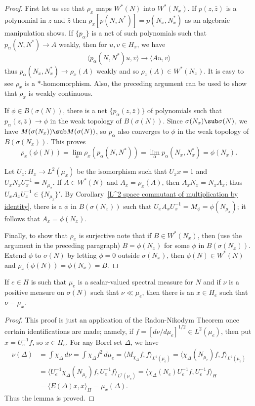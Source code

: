 \begin{proof}
First let us see that $\rho_x$ maps $W^*(N)$ into $W^*(N_x)$. If $p(z,\bar{z})$ is a polynomial in $z$ and $\bar{z}$ then $\rho_x[p(N,N^*)]=p(N_x,N_x^*)$ as an algebraic manipulation shows. If $\{p_\alpha\}$ is a net of such polynomials such that $p_\alpha(N,N^*)\to A$ weakly, then for $u,v\in H_x$, we have
\[\langle p_\alpha(N,N^*)u,v\rangle\to\langle Au,v\rangle\]
thus $p_\alpha(N_x,N_x^*)\to\rho_x(A)$ weakly and so $\rho_x(A)\in W^*(N_x)$. It is easy to see $\rho_x$ is a $*$-homomorphism. Also, the preceding argument can be used to show that $\rho_x$ is weakly continuous.\par
If $\phi\in B(\sigma(N))$, there is a net $\{p_\alpha(z,\bar{z})\}$ of polynomials such that $p_\alpha(z,\bar{z})\to\phi$ in the weak topology of $B(\sigma(N))$. Since $\sigma(N_x)\sub\sigma(N)$, we have $M(\sigma(N_x))\sub M(\sigma(N))$, so $p_\alpha$ also converges to $\phi$ in the weak topology of $B(\sigma(N_x))$. This proves
\[\rho_x(\phi(N))=\lim_{\alpha}\rho_x(p_\alpha(N,N^*))=\lim_\alpha p_\alpha(N_x,N_x^*)=\phi(N_x).\]

Let $U_x:H_x\to L^2(\mu_x)$ be the isomorphism such that $U_xx=1$ and $U_xN_xU_x^{-1}=N_{\mu_x}$. If $A\in W^*(N)$ and $A_x=\rho_x(A)$, then $A_xN_x=N_xA_x$; thus $U_xA_xU_x^{-1}\in\{N_{\mu_x}\}'$. By Corollary~\ref{L^2 space commutant of multiplication by identity}, there is a $\phi$ in $B(\sigma(N_x))$ such that $U_xA_xU_x^{-1}=M_\phi=\phi(N_{\mu_x})$; it follows that $A_x=\phi(N_x)$.\par
Finally, to show that $\rho_x$ is surjective note that if $B\in W^*(N_x)$, then (use the argument in the preceding paragraph) $B=\phi(N_x)$ for some $\phi$ in $B(\sigma(N_x))$. Extend $\phi$ to $\sigma(N)$ by letting $\phi=0$ outside $\sigma(N_x)$, then $\phi(N)\in W^*(N)$ and $\rho_x(\phi(N))=\phi(N_x)=B$.
\end{proof}
\begin{lemma}\label{Hilbert space scalar spectral measure char}
If $e\in H$ is such that $\mu_e$ is a scalar-valued spectral measure for $N$ and if $\nu$ is a positive measure on $\sigma(N)$ such that $\nu\ll\mu_e$, then there is an $x\in H_e$ such that $\nu=\mu_x$.
\end{lemma}
\begin{proof}
This proof is just an application of the Radon-Nikodym Theorem once certain identifications are made; namely, if $f=[d\nu/d\mu_e]^{1/2}\in L^2(\mu_e)$, then put $x=U_{e}^{-1}f$, so $x\in H_e$. For any Borel set $\Delta$, we have
\begin{align*}
\nu(\Delta)&=\int\chi_\Delta\,d\nu=\int\chi_\Delta f^2\,d\mu_e=\langle M_{\chi_\Delta}f,f\rangle_{L^2(\mu_e)}=\langle \chi_\Delta(N_{\mu_e}) f,f\rangle_{L^2(\mu_e)}\\
&=\langle U_e^{-1}\chi_\Delta(N_{\mu_e})f,U_e^{-1}f\rangle_{L^2(\mu_e)}=\langle\chi_\Delta(N_e)U_e^{-1}f,U_e^{-1}f\rangle_H\\
&=\langle E(\Delta)x,x\rangle_H=\mu_x(\Delta).
\end{align*}
Thus the lemma is proved.
\end{proof}
